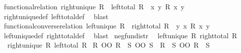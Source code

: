 \begin{isabellebody}
%
\endisadelimproof
\isanewline
{}\isamarkupfalse%
\ functional{\isacharunderscore}{\kern0pt}relation{\isacharcolon}{\kern0pt}\ {\isachardoublequoteopen}right{\isacharunderscore}{\kern0pt}unique\ R\ {\isasymLongrightarrow}\ left{\isacharunderscore}{\kern0pt}total\ R\ {\isasymLongrightarrow}\ {\isasymforall}x{\isachardot}{\kern0pt}\ {\isasymexists}{\isacharbang}{\kern0pt}y{\isachardot}{\kern0pt}\ R\ x\ y{\isachardoublequoteclose}\isanewline
%
\isadelimproof
%
\endisadelimproof
%
\isatagproof
{}\isamarkupfalse%
\ right{\isacharunderscore}{\kern0pt}unique{\isacharunderscore}{\kern0pt}def\ left{\isacharunderscore}{\kern0pt}total{\isacharunderscore}{\kern0pt}def\ \isamarkupfalse%
\ blast%
\endisatagproof
{\isafoldproof}%
%
\isadelimproof
\isanewline
%
\endisadelimproof
\isanewline
{}\isamarkupfalse%
\ functional{\isacharunderscore}{\kern0pt}converse{\isacharunderscore}{\kern0pt}relation{\isacharcolon}{\kern0pt}\ {\isachardoublequoteopen}left{\isacharunderscore}{\kern0pt}unique\ R\ {\isasymLongrightarrow}\ right{\isacharunderscore}{\kern0pt}total\ R\ {\isasymLongrightarrow}\ {\isasymforall}y{\isachardot}{\kern0pt}\ {\isasymexists}{\isacharbang}{\kern0pt}x{\isachardot}{\kern0pt}\ R\ x\ y{\isachardoublequoteclose}\isanewline
%
\isadelimproof
%
\endisadelimproof
%
\isatagproof
{}\isamarkupfalse%
\ left{\isacharunderscore}{\kern0pt}unique{\isacharunderscore}{\kern0pt}def\ right{\isacharunderscore}{\kern0pt}total{\isacharunderscore}{\kern0pt}def\ \isamarkupfalse%
\ blast%
\endisatagproof
{\isafoldproof}%
%
\isadelimproof
\isanewline
%
\endisadelimproof
\isanewline
{}\isamarkupfalse%
\ neg{\isacharunderscore}{\kern0pt}fun{\isacharunderscore}{\kern0pt}distr{}{\isacharcolon}{\kern0pt}\isanewline
{}\ {}{\isacharcolon}{\kern0pt}\ {\isachardoublequoteopen}left{\isacharunderscore}{\kern0pt}unique\ R{\isachardoublequoteclose}\ {\isachardoublequoteopen}right{\isacharunderscore}{\kern0pt}total\ R{\isachardoublequoteclose}\isanewline
{}\ {}{\isacharcolon}{\kern0pt}\ {\isachardoublequoteopen}right{\isacharunderscore}{\kern0pt}unique\ R{\isacharprime}{\kern0pt}{\isachardoublequoteclose}\ {\isachardoublequoteopen}left{\isacharunderscore}{\kern0pt}total\ R{\isacharprime}{\kern0pt}{\isachardoublequoteclose}\isanewline
{}\ {\isachardoublequoteopen}{\isacharparenleft}{\kern0pt}R\ OO\ R{\isacharprime}{\kern0pt}\ {\isacharequal}{\kern0pt}{\isacharequal}{\kern0pt}{\isacharequal}{\kern0pt}{\isachargreater}{\kern0pt}\ S\ OO\ S{\isacharprime}{\kern0pt}{\isacharparenright}{\kern0pt}\ {\isasymle}\ {\isacharparenleft}{\kern0pt}{\isacharparenleft}{\kern0pt}R\ {\isacharequal}{\kern0pt}{\isacharequal}{\kern0pt}{\isacharequal}{\kern0pt}{\isachargreater}{\kern0pt}\ S{\isacharparenright}{\kern0pt}\ OO\ {\isacharparenleft}{\kern0pt}R{\isacharprime}{\kern0pt}\ {\isacharequal}{\kern0pt}{\isacharequal}{\kern0pt}{\isacharequal}{\kern0pt}{\isachargreater}{\kern0pt}\ S{\isacharprime}{\kern0pt}{\isacharparenright}{\kern0pt}{\isacharparenright}{\kern0pt}\ {\isachardoublequoteclose}\isanewline

\end{isabellebody}
